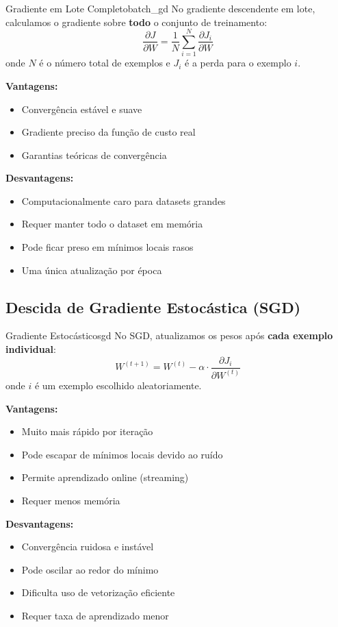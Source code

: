 \documentclass[a4paper,12pt]{article}
\newcommand{\grad}[2]{\frac{\partial #1}{\partial #2}}
\begin{document}
\begin{definicao}{Gradiente em Lote Completo}{batch_gd}
No gradiente descendente em lote, calculamos o gradiente sobre \textbf{todo} o conjunto de treinamento:
\[
\grad{J}{W} = \frac{1}{N} \sum_{i=1}^{N} \grad{J_i}{W}
\]
onde $N$ é o número total de exemplos e $J_i$ é a perda para o exemplo $i$.
\end{definicao}

\textbf{Vantagens:}
\begin{itemize}
    \item Convergência estável e suave
    \item Gradiente preciso da função de custo real
    \item Garantias teóricas de convergência
\end{itemize}

\textbf{Desvantagens:}
\begin{itemize}
    \item Computacionalmente caro para datasets grandes
    \item Requer manter todo o dataset em memória
    \item Pode ficar preso em mínimos locais rasos
    \item Uma única atualização por época
\end{itemize}

\subsection{Descida de Gradiente Estocástica (SGD)}

\begin{definicao}{Gradiente Estocástico}{sgd}
No SGD, atualizamos os pesos após \textbf{cada exemplo individual}:
\[
W^{(t+1)} = W^{(t)} - \alpha \cdot \grad{J_i}{W^{(t)}}
\]
onde $i$ é um exemplo escolhido aleatoriamente.
\end{definicao}

\textbf{Vantagens:}
\begin{itemize}
    \item Muito mais rápido por iteração
    \item Pode escapar de mínimos locais devido ao ruído
    \item Permite aprendizado online (streaming)
    \item Requer menos memória
\end{itemize}

\textbf{Desvantagens:}
\begin{itemize}
    \item Convergência ruidosa e instável
    \item Pode oscilar ao redor do mínimo
    \item Dificulta uso de vetorização eficiente
    \item Requer taxa de aprendizado menor
\end{itemize}
\end{document}
